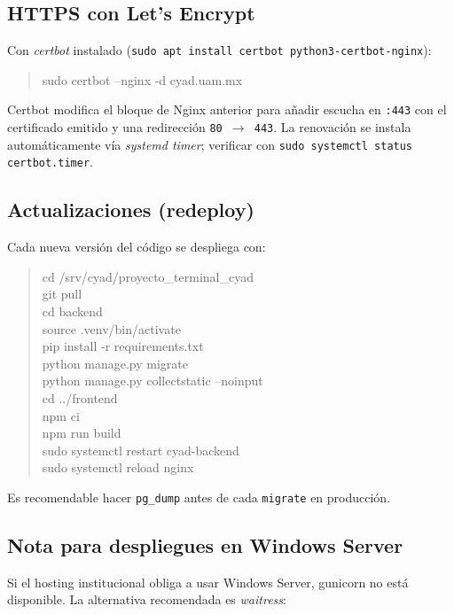 \documentclass{computacion}
\begin{document}
\subsection{HTTPS con Let's Encrypt}

Con \emph{certbot} instalado (\texttt{sudo apt install certbot python3-certbot-nginx}):

\begin{quote}\ttfamily
sudo certbot --nginx -d cyad.uam.mx
\end{quote}

Certbot modifica el bloque de Nginx anterior para añadir escucha en \texttt{:443} con el certificado emitido y una redirección \texttt{80 $\to$ 443}. La renovación se instala automáticamente vía \emph{systemd timer}; verificar con \texttt{sudo systemctl status certbot.timer}.

\subsection{Actualizaciones (redeploy)}

Cada nueva versión del código se despliega con:

\begin{quote}\ttfamily
cd /srv/cyad/proyecto\_terminal\_cyad \\
git pull \\
cd backend \\
source .venv/bin/activate \\
pip install -r requirements.txt \\
python manage.py migrate \\
python manage.py collectstatic --noinput \\
cd ../frontend \\
npm ci \\
npm run build \\
sudo systemctl restart cyad-backend \\
sudo systemctl reload nginx
\end{quote}

Es recomendable hacer \texttt{pg\_dump} antes de cada \texttt{migrate} en producción.

\subsection{Nota para despliegues en Windows Server}

Si el hosting institucional obliga a usar Windows Server, gunicorn no está disponible. La alternativa recomendada es \emph{waitress}:
\end{document}
